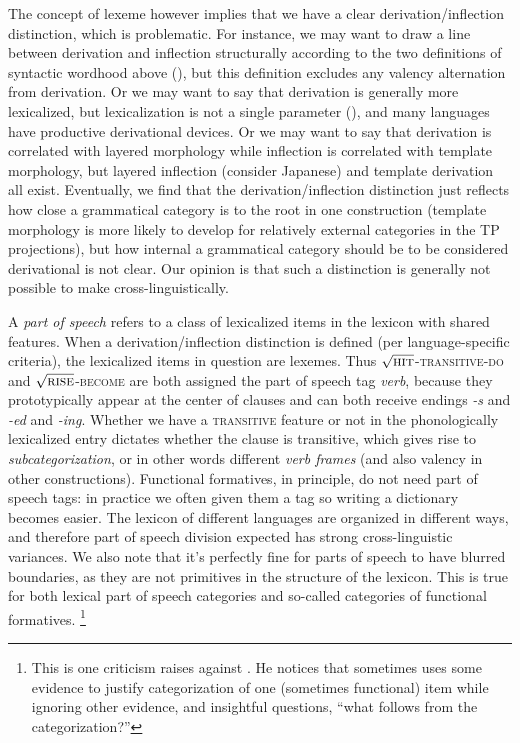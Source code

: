 \documentclass[UTF8, a4paper, oneside, scheme=plain, 12pt]{ctexrep}
\newcommand*{\term}[1]{\emph{#1}}
\newcommand{\form}[1]{\emph{#1}}
\newcommand*{\category}[1]{\textsc{#1}}
\newcommand*{\wordroot}[1]{$\sqrt{\text{\textsc{#1}}}$}
\begin{document}
{The concept of lexeme however implies that we have a clear derivation/inflection distinction, which is problematic.
For instance, we may want to draw a line between derivation and inflection structurally
according to the two definitions of syntactic wordhood above (),
but this definition excludes any valency alternation from derivation.
Or we may want to say that derivation is generally more lexicalized,
but lexicalization is not a single parameter (),
and many languages have productive derivational devices.
Or we may want to say that derivation is correlated with layered morphology
while inflection is correlated with template morphology,
but layered inflection (consider Japanese)
and template derivation all exist.
Eventually, we find that the derivation/inflection distinction
just reflects how close a grammatical category is to the root in one construction
(template morphology is more likely to develop for
relatively external categories in the TP projections),
but how internal a grammatical category should be to be considered derivational is not clear.
Our opinion is that such a distinction is generally not possible to make cross-linguistically.

A \term{part of speech} refers to a class of lexicalized items in the lexicon with shared features.
When a derivation/inflection distinction is defined (per language-specific criteria),
the lexicalized items in question are lexemes.
Thus \wordroot{hit}-\category{transitive}-\category{do}
and \wordroot{rise}-\category{become}
are both assigned the part of speech tag \term{verb},
because they prototypically appear at the center of clauses
and can both receive endings \form{-s} and \form{-ed} and \form{-ing}.
Whether we have a \category{transitive} feature or not in the phonologically lexicalized entry
dictates whether the clause is transitive,
which gives rise to \term{subcategorization}, or in other words different \term{verb frames}
(and also valency in other constructions).
Functional formatives, in principle, do not need part of speech tags:
in practice we often given them a tag so writing a dictionary becomes easier.
The lexicon of different languages are organized in different ways,
and therefore part of speech division expected has strong cross-linguistic variances.
We also note that it's perfectly fine for parts of speech to have blurred boundaries,
as they are not primitives in the structure of the lexicon.
This is true for both lexical part of speech categories and
so-called categories of functional formatives.%
\footnote{
    This is one criticism \citet{culicover2004cambridge} raises against \citet{cgel}.
    He notices that \citet{cgel} sometimes uses some evidence to 
    justify categorization of one (sometimes functional) item while ignoring other evidence,
    and insightful questions, ``what follows from the categorization?''
}

}
\end{document}
